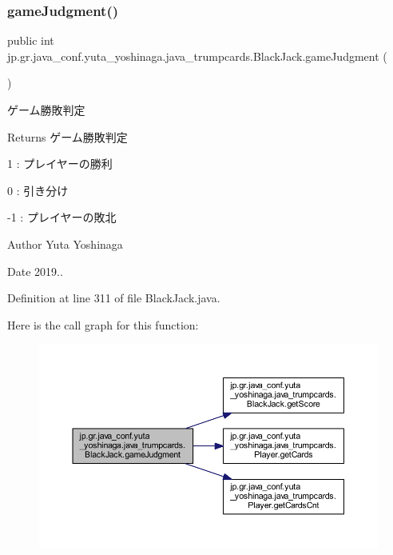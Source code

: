 \subsubsection{\texorpdfstring{game\+Judgment()}{gameJudgment()}}
{\footnotesize\ttfamily public int jp.\+gr.\+java\+\_\+conf.\+yuta\+\_\+yoshinaga.\+java\+\_\+trumpcards.\+Black\+Jack.\+game\+Judgment (\begin{DoxyParamCaption}{ }\end{DoxyParamCaption})}



ゲーム勝敗判定 

\begin{DoxyReturn}{Returns}
ゲーム勝敗判定
\begin{DoxyItemize}
\item 1 \+: プレイヤーの勝利
\item 0 \+: 引き分け
\item -\/1 \+: プレイヤーの敗北
\end{DoxyItemize}
\end{DoxyReturn}
\begin{DoxyAuthor}{Author}
Yuta Yoshinaga 
\end{DoxyAuthor}
\begin{DoxyDate}{Date}
2019.. 
\end{DoxyDate}


Definition at line 311 of file Black\+Jack.\+java.

Here is the call graph for this function\+:
\nopagebreak
\begin{figure}[H]
\begin{center}
\leavevmode
\includegraphics[width=350pt]{classjp_1_1gr_1_1java__conf_1_1yuta__yoshinaga_1_1java__trumpcards_1_1_black_jack_a26f4a11e36c237ec64f08010b8ea0a01_cgraph}
\end{center}
\end{figure}
\mbox{\label{classjp_1_1gr_1_1java__conf_1_1yuta__yoshinaga_1_1java__trumpcards_1_1_black_jack_ae3829512336f2ca3f931924b435c8593}} 
